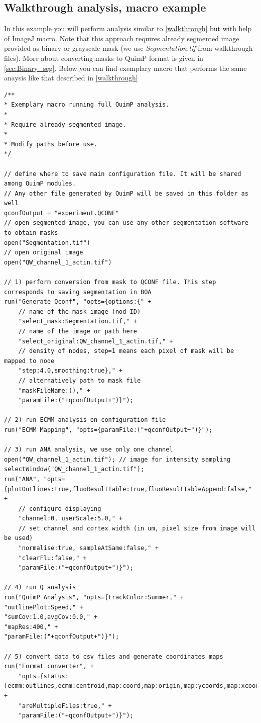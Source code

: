 \documentclass[a4paper,12pt]{article}
\begin{document}
\subsection{Walkthrough analysis, macro example}
\label{sec:walk_macro}
In this example you will perform analysis similar to \autoref{walkthrough} but with help of ImageJ macro. Note that this approach requires already segmented image provided as binary or grayscale mask (we use \textit{Segmentation.tif} from walkthrough files). More about converting masks to QuimP format is given in \autoref{sec:Binary_seg}. Below you can find exemplary macro that performs the same anaysis like that described in \autoref{walkthrough}  

\begin{lstlisting}[]
/**
* Exemplary macro running full QuimP analysis.
* 
* Require already segmented image.
* 
* Modify paths before use.
*/

// define where to save main configuration file. It will be shared among QuimP modules.
// Any other file generated by QuimP will be saved in this folder as well
qconfOutput = "experiment.QCONF"
// open segmented image, you can use any other segmentation software to obtain masks
open("Segmentation.tif")
// open original image
open("QW_channel_1_actin.tif")

// 1) perform conversion from mask to QCONF file. This step corresponds to saving segmentation in BOA 
run("Generate Qconf", "opts={options:{" +
	// name of the mask image (nod ID)
	"select_mask:Segmentation.tif," +	
	// name of the image or path here
	"select_original:QW_channel_1_actin.tif," + 
	// density of nodes, step=1 means each pixel of mask will be mapped to node
	"step:4.0,smoothing:true}," +	
	// alternatively path to mask file
	"maskFileName:()," +				
	"paramFile:("+qconfOutput+")}");

// 2) run ECMM analysis on configuration file
run("ECMM Mapping", "opts={paramFile:("+qconfOutput+")}");

// 3) run ANA analysis, we use only one channel
open("QW_channel_1_actin.tif"); // image for intensity sampling
selectWindow("QW_channel_1_actin.tif");
run("ANA", "opts={plotOutlines:true,fluoResultTable:true,fluoResultTableAppend:false," + 
	// configure displaying
	"channel:0, userScale:5.0," + 
	// set channel and cortex width (in um, pixel size from image will be used)
	"normalise:true, sampleAtSame:false," +
	"clearFlu:false," +
	"paramFile:("+qconfOutput+")}");

// 4) run Q analysis
run("QuimP Analysis", "opts={trackColor:Summer," +
"outlinePlot:Speed," +
"sumCov:1.0,avgCov:0.0," +
"mapRes:400," +
"paramFile:("+qconfOutput+")}");

// 5) convert data to csv files	and generate coordinates maps	
run("Format converter", +
	"opts={status:[ecmm:outlines,ecmm:centroid,map:coord,map:origin,map:ycoords,map:xcoords]," +
	"areMultipleFiles:true," +
	"paramFile:("+qconfOutput+")}");
\end{lstlisting}
\end{document}

